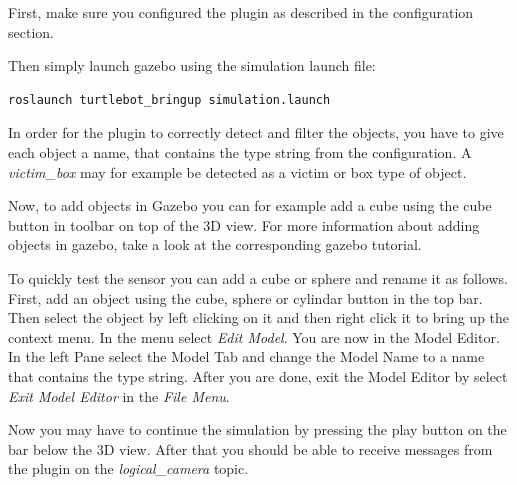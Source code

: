 First, make sure you configured the plugin as described in the configuration section.

Then simply launch gazebo using the simulation launch file:

\begin{verbatim}
roslaunch turtlebot_bringup simulation.launch
\end{verbatim}

In order for the plugin to correctly detect and filter the objects, you have to give each object a name, that contains the type string from the configuration. A \textit{victim\_box} may for example be detected  as a victim or box type of object.

Now, to add objects in Gazebo you can for example add a cube using the cube button in toolbar on top of the 3D view. For more information about adding objects in gazebo, take a look at the corresponding gazebo tutorial.

To quickly test the sensor you can add a cube or sphere and rename it as follows.  First, add an object using the cube, sphere or cylindar button in the top bar. Then select the object by left clicking on it and then right click it to bring up the context menu. In the menu select \textit{Edit Model}. You are now in the Model Editor. In the left Pane select the Model Tab and change the Model Name to a name that contains the type string. After you are done, exit the Model Editor by select \textit{Exit Model Editor} in the \textit{File Menu}.

Now you may have to continue the simulation by pressing the play button on the bar below the 3D view. After that you should be able to receive messages from the plugin on the \textit{logical\_camera} topic.